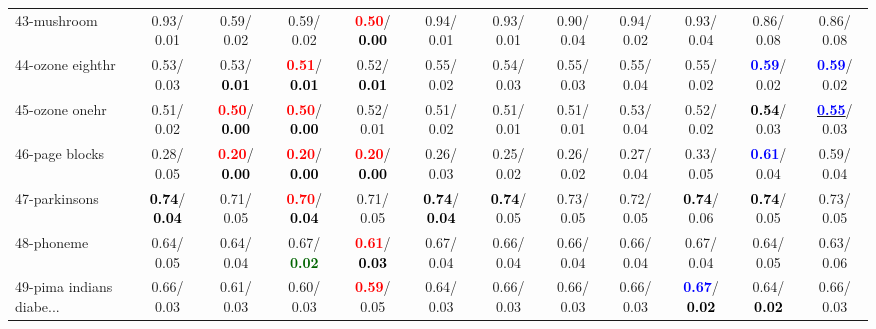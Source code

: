 \begin{table}[h]
\begin{center}
{\begin{tabular}{lc|c|c|c|c|c|c|c|c|c|c}
43-mushroom &   0.93/  0.01 &   0.59/  0.02 &   0.59/  0.02 & \textcolor{red}{\textbf{  0.50}}/\textcolor{black}{\textbf{  0.00}} &   0.94/  0.01 &   0.93/  0.01 &   0.90/  0.04 &   0.94/  0.02 &   0.93/  0.04 &   0.86/  0.08 &   0.86/  0.08 \\
44-ozone eighthr &   0.53/  0.03 &   0.53/\textcolor{black}{\textbf{  0.01}} & \textcolor{red}{\textbf{  0.51}}/\textcolor{black}{\textbf{  0.01}} &   0.52/\textcolor{black}{\textbf{  0.01}} &   0.55/  0.02 &   0.54/  0.03 &   0.55/  0.03 &   0.55/  0.04 &   0.55/  0.02 & \textcolor{blue}{\textbf{  0.59}}/  0.02 & \textcolor{blue}{\textbf{  0.59}}/  0.02 \\
45-ozone onehr &   0.51/  0.02 & \textcolor{red}{\textbf{  0.50}}/\textcolor{black}{\textbf{  0.00}} & \textcolor{red}{\textbf{  0.50}}/\textcolor{black}{\textbf{  0.00}} &   0.52/  0.01 &   0.51/  0.02 &   0.51/  0.01 &   0.51/  0.01 &   0.53/  0.04 &   0.52/  0.02 & \textcolor{black}{\textbf{  0.54}}/  0.03 & \underline{\textcolor{blue}{\textbf{  0.55}}}/  0.03 \\
46-page blocks &   0.28/  0.05 & \textcolor{red}{\textbf{  0.20}}/\textcolor{black}{\textbf{  0.00}} & \textcolor{red}{\textbf{  0.20}}/\textcolor{black}{\textbf{  0.00}} & \textcolor{red}{\textbf{  0.20}}/\textcolor{black}{\textbf{  0.00}} &   0.26/  0.03 &   0.25/  0.02 &   0.26/  0.02 &   0.27/  0.04 &   0.33/  0.05 & \textcolor{blue}{\textbf{  0.61}}/  0.04 &   0.59/  0.04 \\ \hline
47-parkinsons & \textcolor{black}{\textbf{  0.74}}/\textcolor{black}{\textbf{  0.04}} &   0.71/  0.05 & \textcolor{red}{\textbf{  0.70}}/\textcolor{black}{\textbf{  0.04}} &   0.71/  0.05 & \textcolor{black}{\textbf{  0.74}}/\textcolor{black}{\textbf{  0.04}} & \textcolor{black}{\textbf{  0.74}}/  0.05 &   0.73/  0.05 &   0.72/  0.05 & \textcolor{black}{\textbf{  0.74}}/  0.06 & \textcolor{black}{\textbf{  0.74}}/  0.05 &   0.73/  0.05 \\
48-phoneme &   0.64/  0.05 &   0.64/  0.04 &   0.67/\textcolor{darkgreen}{\textbf{  0.02}} & \textcolor{red}{\textbf{  0.61}}/\textcolor{black}{\textbf{  0.03}} &   0.67/  0.04 &   0.66/  0.04 &   0.66/  0.04 &   0.66/  0.04 &   0.67/  0.04 &   0.64/  0.05 &   0.63/  0.06 \\
49-pima indians diabe... &   0.66/  0.03 &   0.61/  0.03 &   0.60/  0.03 & \textcolor{red}{\textbf{  0.59}}/  0.05 &   0.64/  0.03 &   0.66/  0.03 &   0.66/  0.03 &   0.66/  0.03 & \textcolor{blue}{\textbf{  0.67}}/\textcolor{black}{\textbf{  0.02}} &   0.64/\textcolor{black}{\textbf{  0.02}} &   0.66/  0.03 \\

\end{tabular}}
\end{center}
\end{table}
